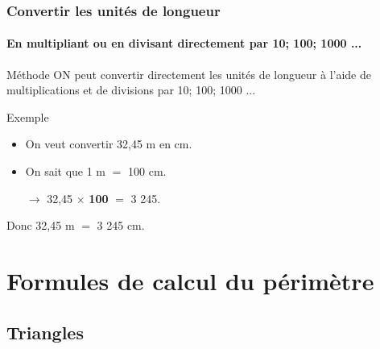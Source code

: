 \documentclass[xcolor=table]{beamer}
\begin{document}
\begin{frame}
	\frametitle{Convertir les unités de longueur}  
	\framesubtitle{En multipliant ou en divisant directement par 10; 100; 1000 ...}	
	
	\begin{alertblock}{Méthode}
		ON peut convertir directement les unités de longueur à l'aide de multiplications et de divisions par 10; 100; 1000 ...
	\end{alertblock}
	
	\begin{block}{Exemple}
		\begin{itemize}
			\item On veut convertir 32,45 m en cm.
			\item On sait que 1 m $=$ 100 cm.
			\item[$\rightarrow$] 32,45 $\times$ \textbf{100} $=$ 3 245.
		\end{itemize}
		
		Donc 32,45 m $=$ 3 245 cm.		
	\end{block}
	
\end{frame}

\section{Formules de calcul du périmètre}

\subsection{Triangles}
\end{document}

